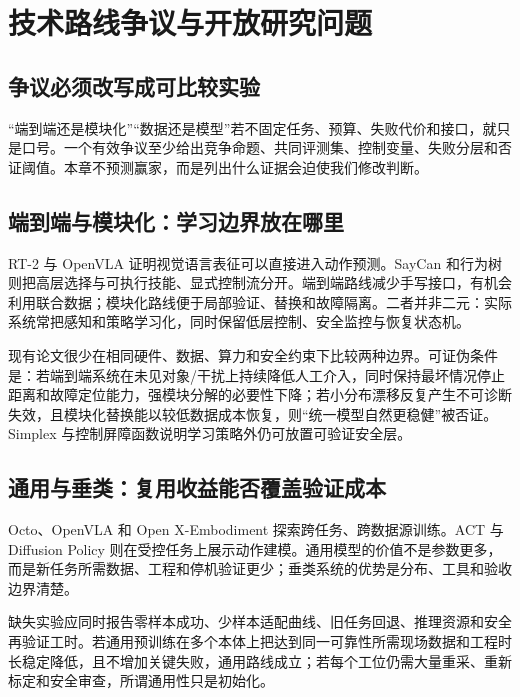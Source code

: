 \chapter{技术路线争议与开放研究问题}
\label{chap:technical-debates}

\section{争议必须改写成可比较实验}

“端到端还是模块化”“数据还是模型”若不固定任务、预算、失败代价和接口，就只是口号。一个有效争议至少给出竞争命题、共同评测集、控制变量、失败分层和否证阈值。本章不预测赢家，而是列出什么证据会迫使我们修改判断。

\section{端到端与模块化：学习边界放在哪里}

RT-2 与 OpenVLA 证明视觉语言表征可以直接进入动作预测\cite{brohan2023rt2,kim2024openvla}。SayCan 和行为树则把高层选择与可执行技能、显式控制流分开\cite{ahn2022saycan,colledanchise2018behaviortrees}。端到端路线减少手写接口，有机会利用联合数据；模块化路线便于局部验证、替换和故障隔离。二者并非二元：实际系统常把感知和策略学习化，同时保留低层控制、安全监控与恢复状态机。

现有论文很少在相同硬件、数据、算力和安全约束下比较两种边界。可证伪条件是：若端到端系统在未见对象/干扰上持续降低人工介入，同时保持最坏情况停止距离和故障定位能力，强模块分解的必要性下降；若小分布漂移反复产生不可诊断失效，且模块化替换能以较低数据成本恢复，则“统一模型自然更稳健”被否证。Simplex 与控制屏障函数说明学习策略外仍可放置可验证安全层\cite{sha2001simplex,ames2017cbf}。

\section{通用与垂类：复用收益能否覆盖验证成本}

Octo、OpenVLA 和 Open X-Embodiment 探索跨任务、跨数据源训练\cite{octo2024,kim2024openvla,openx2024}。ACT 与 Diffusion Policy 则在受控任务上展示动作建模\cite{zhao2023act,chi2023diffusionpolicy}。通用模型的价值不是参数更多，而是新任务所需数据、工程和停机验证更少；垂类系统的优势是分布、工具和验收边界清楚。

缺失实验应同时报告零样本成功、少样本适配曲线、旧任务回退、推理资源和安全再验证工时。若通用预训练在多个本体上把达到同一可靠性所需现场数据和工程时长稳定降低，且不增加关键失败，通用路线成立；若每个工位仍需大量重采、重新标定和安全审查，所谓通用性只是初始化。

